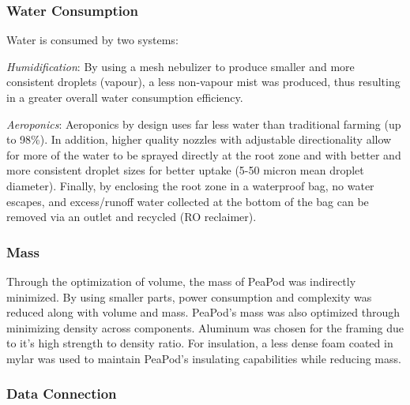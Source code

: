 \documentclass{report}
\begin{document}

\subsubsection{Water Consumption}
\label{sec:constraints-water}





Water is consumed by two systems:

\textit{Humidification}: By using a mesh nebulizer to produce smaller and more consistent droplets (vapour), a less non-vapour mist was produced, thus resulting in a greater overall water consumption efficiency.

\textit{Aeroponics}: Aeroponics by design uses far less water than traditional farming (up to 98\%). In addition, higher quality nozzles with adjustable directionality allow for more of the water to be sprayed directly at the root zone and with better and more consistent droplet sizes for better uptake (5-50 micron mean droplet diameter). Finally, by enclosing the root zone in a waterproof bag, no water escapes, and excess/runoff water collected at the bottom of the bag can be removed via an outlet and recycled (RO reclaimer).

\subsubsection{Mass} 
\label{sec:constraints-mass}

Through the optimization of volume, the mass of PeaPod was indirectly minimized. By using smaller parts, power consumption and complexity was reduced along with volume and mass. PeaPod's mass was also optimized through minimizing density across components. Aluminum was chosen for the framing due to it's high strength to density ratio. For insulation, a less dense foam coated in mylar was used to maintain PeaPod's insulating capabilities while reducing mass.

\subsubsection{Data Connection} 
\label{sec:constraints-data}
\end{document}
